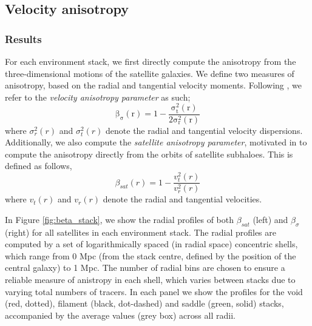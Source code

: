 \subsection{Velocity anisotropy} \label{sec:velocity_anisotropy}
\subsubsection{Results}
For each environment stack, we first directly compute the anisotropy from the three-dimensional motions of the satellite galaxies. We define two measures of anisotropy, based on the radial and tangential velocity moments. Following \citet{faltenbacher2010}, we refer to the \textit{velocity anisotropy parameter} as such;
\begin{equation} \label{eq:vel_ani_sigma}
\mathrm{\beta_{\sigma}(r) = 1 - \frac{\sigma_t^2(r)}{2 \sigma_r^2(r)} }
\end{equation}
where $\sigma_r^2(r)$ and $\sigma_t^2(r)$ denote the radial and tangential velocity dispersions. Additionally, we also compute the \textit{satellite anisotropy parameter}, motivated in \citet{ZOMGiii} to compute the anisotropy directly from the orbits of satellite subhaloes. This is defined as follows,
\begin{equation}
\beta_{sat}(r) = 1 - \frac{v_{t}^2(r)}{v_{r}^{2}(r)} 
\end{equation}
where $v_{t}(r)$ and $v_{r}(r)$ denote the radial and tangential velocities.

 In Figure \ref{fig:beta_stack}, we show the radial profiles of both $\beta_{sat}$ (left) and $\beta_{\sigma}$ (right) for all satellites in each environment stack. The radial profiles are computed by a set of logarithmically spaced (in radial space) concentric shells, which range from 0 Mpc (from the stack centre, defined by the position of the central galaxy) to 1 Mpc. The number of radial bins are chosen to ensure a reliable measure of anistropy in each shell, which varies between stacks due to varying total numbers of tracers. In each panel we show the profiles for the void (red, dotted), filament (black, dot-dashed) and saddle (green, solid) stacks, accompanied by the average values (grey box) across all radii. 

